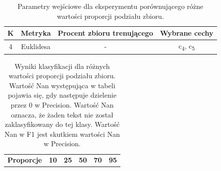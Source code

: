 \documentclass{classrep}
\begin{document}
\begin{table}[h!]
\caption{Parametry wejściowe dla eksperymentu porównującego różne wartości proporcji podziału zbioru. }
\centering
\vspace{0.1cm}
 \begin{tabular}{c c c c}
    \textbf{K} & \textbf{Metryka}   & \textbf{Procent zbioru trenującego}  & \textbf{Wybrane cechy}   \\
\hline
4 & Euklidesa & - &  c\textsubscript{4}, c\textsubscript{5}\\
\end {tabular}
\label {Parametry wejściowe dla eksperymentu porównującego różne wartości proporcji podziału zbioru. }
\end{table}

\newpage
\begin{table}[h!]
\caption{Wyniki klasyfikacji dla różnych wartości proporcji podziału zbioru. Wartość Nan występująca w tabeli pojawia się, gdy następuje dzielenie przez 0 w Precision. Wartość Nan oznacza, że żaden tekst nie został zaklasyfikowany do tej klasy. Wartość Nan w F1 jest skutkiem wartości Nan w Precision. }
\centering
\vspace{0.1cm}
 \begin{tabular}{c c c c c c}

    \textbf{Proporcje} & \textbf{10}   & \textbf{25}  & \textbf{50}  & \textbf{70}  & \textbf{95}\\


\end{tabular}
\end{table}
\end{document}
